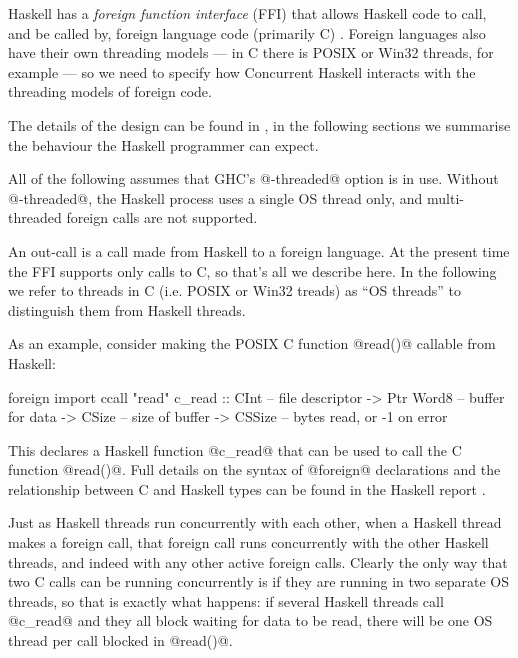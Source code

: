 
Haskell has a \emph{foreign function interface} (FFI) that allows
Haskell code to call, and be called by, foreign language code
(primarily C) \cite{haskell2010}.  Foreign languages also have their
own threading models --- in C there is POSIX or Win32 threads, for
example --- so we need to specify how Concurrent Haskell interacts
with the threading models of foreign code.

The details of the design can be found in \citet{conc-ffi}, in the
following sections we summarise the behaviour the Haskell programmer
can expect.

All of the following assumes that GHC's @-threaded@ option is in use.
Without @-threaded@, the Haskell process uses a single OS thread only,
and multi-threaded foreign calls are not supported.


An out-call is a call made from Haskell to a foreign language.  At the
present time the FFI supports only calls to C, so that's all we
describe here.  In the following we refer to threads in C (i.e. POSIX
or Win32 treads) as ``OS threads'' to distinguish them from Haskell
threads.

As an example, consider making the POSIX C function @read()@ callable
from Haskell:

\begin{haskell}
foreign import ccall "read"
   c_read :: CInt      -- file descriptor
          -> Ptr Word8 -- buffer for data
          -> CSize     -- size of buffer
          -> CSSize    -- bytes read, or -1 on error
\end{haskell}

\noindent This declares a Haskell function @c_read@ that can be used
to call the C function @read()@.  Full details on the syntax of
@foreign@ declarations and the relationship between C and Haskell
types can be found in the Haskell report \cite{haskell2010}.

Just as Haskell threads run concurrently with each other, when a
Haskell thread makes a foreign call, that foreign call runs
concurrently with the other Haskell threads, and indeed with any other
active foreign calls.  Clearly the only way that two C calls can be
running concurrently is if they are running in two separate OS
threads, so that is exactly what happens: if several Haskell threads
call @c_read@ and they all block waiting for data to be read, there
will be one OS thread per call blocked in @read()@.

